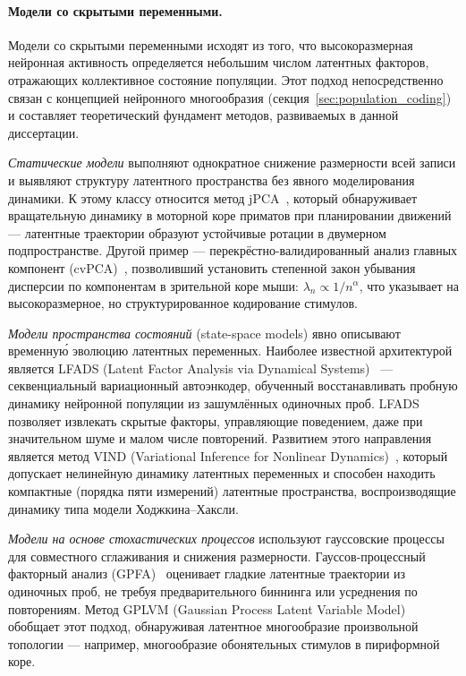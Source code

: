 \paragraph{Модели со скрытыми переменными.}
Модели со скрытыми переменными исходят из того, что высокоразмерная нейронная активность определяется небольшим числом латентных факторов, отражающих коллективное состояние популяции. Этот подход непосредственно связан с концепцией нейронного многообразия (секция~\ref{sec:population_coding}) и составляет теоретический фундамент методов, развиваемых в данной диссертации.

\textit{Статические модели} выполняют однократное снижение размерности всей записи и выявляют структуру латентного пространства без явного моделирования динамики. К этому классу относится метод jPCA~\cite{Churchland2012}, который обнаруживает вращательную динамику в моторной коре приматов при планировании движений --- латентные траектории образуют устойчивые ротации в двумерном подпространстве. Другой пример --- перекрёстно-валидированный анализ главных компонент (cvPCA)~\cite{Stringer2019}, позволивший установить степенной закон убывания дисперсии по компонентам в зрительной коре мыши: $\lambda_n \propto 1/n^\alpha$, что указывает на высокоразмерное, но структурированное кодирование стимулов.

\textit{Модели пространства состояний} (state-space models) явно описывают временну\'{ю} эволюцию латентных переменных. Наиболее известной архитектурой является LFADS (Latent Factor Analysis via Dynamical Systems)~\cite{Pandarinath2018} --- секвенциальный вариационный автоэнкодер, обученный восстанавливать пробную динамику нейронной популяции из зашумлённых одиночных проб. LFADS позволяет извлекать скрытые факторы, управляющие поведением, даже при значительном шуме и малом числе повторений. Развитием этого направления является метод VIND (Variational Inference for Nonlinear Dynamics)~\cite{ZhaoPark2017}, который допускает нелинейную динамику латентных переменных и способен находить компактные (порядка пяти измерений) латентные пространства, воспроизводящие динамику типа модели Ходжкина--Хаксли.

\textit{Модели на основе стохастических процессов} используют гауссовские процессы для совместного сглаживания и снижения размерности. Гауссов-процессный факторный анализ (GPFA)~\cite{Yu2009} оценивает гладкие латентные траектории из одиночных проб, не требуя предварительного биннинга или усреднения по повторениям. Метод GPLVM (Gaussian Process Latent Variable Model)~\cite{wu2018} обобщает этот подход, обнаруживая латентное многообразие произвольной топологии --- например, многообразие обонятельных стимулов в пириформной коре.

